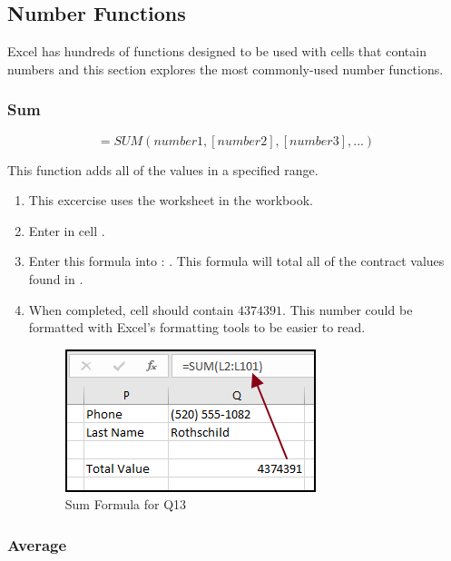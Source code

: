 \subsection{Number Functions}

Excel has hundreds of functions designed to be used with cells that contain numbers and this section explores the most commonly-used number functions.

\subsubsection{Sum}

\[ =SUM(number1, [number2], [number3], ...) \]

This function adds all of the values in a specified range. 

\begin{enumerate}
	\item This excercise uses the  worksheet in the  workbook.
	\item Enter  in cell .
	\item Enter this formula into : . This formula will total all of the contract values found in .
	\item When completed, cell  should contain $ 4374391 $. This number could be formatted with Excel's formatting tools to be easier to read.

	\begin{figure}[H]
		\centering
		\includegraphics[width=\maxwidth{.95\linewidth}]{gfx/ch09_fig38}
		\caption{Sum Formula for Q13}
		\label{09:fig38}
	\end{figure}
	
\end{enumerate}

\subsubsection{Average}

